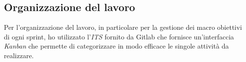\subsection{Organizzazione del lavoro}
Per l'organizzazione del lavoro, in particolare per la gestione dei macro obiettivi di ogni sprint, ho utilizzato l'\emph{ITS} fornito da Gitlab che fornisce un'interfaccia \emph{Kanban} che permette di categorizzare in modo efficace le singole attività da realizzare.























